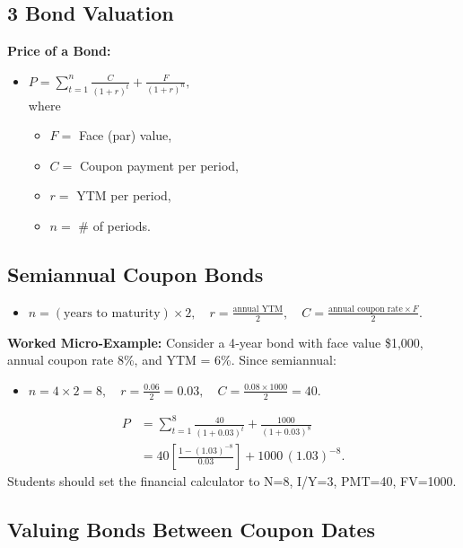 \documentclass[10pt,landscape,fleqn]{article}
\begin{document}
\begin{multicols}{3}
\section*{3 Bond Valuation}

\textbf{Price of a Bond:}
\begin{itemize}
  \item $P = \sum_{t=1}^n \frac{C}{(1+r)^t} + \frac{F}{(1+r)^n},$ \\
    where
    \begin{itemize}
      \item $F=$ Face (par) value,
      \item $C=$ Coupon payment per period,
      \item $r=$ YTM per period,
      \item $n=$ \# of periods.
    \end{itemize}
\end{itemize}

\subsection*{Semiannual Coupon Bonds}
\begin{itemize}
  \item $n = (\text{years to maturity})\times 2, \quad r = \frac{\text{annual YTM}}{2}, \quad C = \frac{\text{annual coupon rate} \times F}{2}.$
\end{itemize}
\textbf{Worked Micro‐Example:} Consider a 4‐year bond with face value \$1,000, annual coupon rate 8\%, and YTM = 6\%. Since semiannual:
\begin{itemize}
  \item $n = 4 \times 2 = 8,\quad r = \frac{0.06}{2} = 0.03,\quad C = \frac{0.08 \times 1000}{2} = 40.$
\end{itemize}
\begin{align*}
  P &= \sum_{t=1}^{8} \frac{40}{(1+0.03)^t} + \frac{1000}{(1+0.03)^8} \\
    &= 40\left[\frac{1 - (1.03)^{-8}}{0.03}\right] + 1000\,(1.03)^{-8}.
\end{align*}
Students should set the financial calculator to N=8, I/Y=3, PMT=40, FV=1000.

\subsection*{Valuing Bonds Between Coupon Dates}

\end{multicols}
\end{document}
